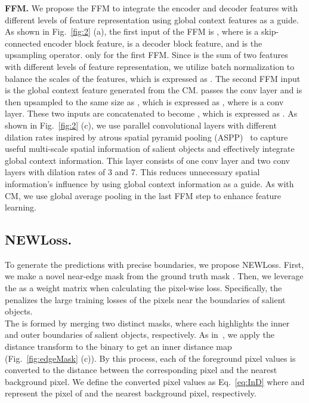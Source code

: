 \documentclass{article}
\begin{document}
\noindent
\textbf{FFM.} We propose the FFM to integrate the encoder and decoder features with different levels of feature representation using global context features as a guide. As shown in Fig.~\ref{fig:2} (a), the first input of the FFM is , where  is a skip-connected  encoder block feature,  is a  decoder block feature, and  is the upsampling operator.  only for the first FFM. Since  is the sum of two features with different levels of feature representation, we utilize batch normalization to balance the scales of the features, which is expressed as . The second FFM input is the global context feature  generated from the CM.  passes the  conv layer and is then upsampled to the same size as , which is expressed as , where  is a  conv layer. These two inputs are concatenated to become , which is expressed as . As shown in Fig.~\ref{fig:2} (c), we use parallel convolutional layers with different dilation rates inspired by atrous spatial pyramid pooling (ASPP)~\cite{chen2017rethinking} to capture useful multi-scale spatial information of salient objects and effectively integrate global context information. This layer consists of one  conv layer and two  conv layers with dilation rates of 3 and 7. This reduces unnecessary spatial information’s influence by using global context information as a guide. As with CM, we use global average pooling in the last FFM step to enhance feature learning.

\vspace{-0.3cm}
\subsection{NEWLoss.}
\label{ssec:loss}
\vspace{-0.2cm}
To generate the predictions with precise boundaries, we propose NEWLoss. First, we make a novel near-edge mask  from the ground truth mask . Then, we leverage the  as a weight matrix when calculating the pixel-wise loss. Specifically, the  penalizes the large training losses of the pixels near the boundaries of salient objects. \\
\indent The  is formed by merging two distinct masks, where each highlights the inner and outer boundaries of salient objects, respectively. As in~\cite{wei2020label}, we apply the distance transform to the binary  to get an inner distance map  (Fig.~\ref{fig:edgeMask} (c)). By this process, each of the foreground pixel values is converted to the distance between the corresponding pixel and the nearest background pixel. We define the converted pixel values  as Eq.~\ref{eq:InD} where  and  represent the pixel of  and the nearest background pixel, respectively. 
\vspace{-0.1cm}
\end{document}
